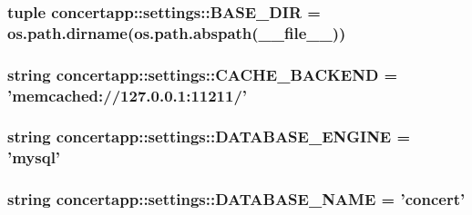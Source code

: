 \label{namespaceconcertapp_1_1settings_a8c1ac824cf01b178c085f46a12a0b747}
\hypertarget{namespaceconcertapp_1_1settings_a885ea24527143834f9d5b4a14176ffd0}{
\subsubsection[{BASE\_\-DIR}]{\setlength{\rightskip}{0pt plus 5cm}tuple {\bf concertapp::settings::BASE\_\-DIR} = os.path.dirname(os.path.abspath(\_\-\_\-file\_\-\_\-))}}
\label{namespaceconcertapp_1_1settings_a885ea24527143834f9d5b4a14176ffd0}
\hypertarget{namespaceconcertapp_1_1settings_aca003552cce2e329b71193ab95f9d02d}{
\subsubsection[{CACHE\_\-BACKEND}]{\setlength{\rightskip}{0pt plus 5cm}string {\bf concertapp::settings::CACHE\_\-BACKEND} = 'memcached://127.0.0.1:11211/'}}
\label{namespaceconcertapp_1_1settings_aca003552cce2e329b71193ab95f9d02d}
\hypertarget{namespaceconcertapp_1_1settings_af522d15c4d99b4a69ffa7c67722902e1}{
\subsubsection[{DATABASE\_\-ENGINE}]{\setlength{\rightskip}{0pt plus 5cm}string {\bf concertapp::settings::DATABASE\_\-ENGINE} = 'mysql'}}
\label{namespaceconcertapp_1_1settings_af522d15c4d99b4a69ffa7c67722902e1}
\hypertarget{namespaceconcertapp_1_1settings_a4d86bb87bfe8f05c81b33104e66b797a}{
\subsubsection[{DATABASE\_\-NAME}]{\setlength{\rightskip}{0pt plus 5cm}string {\bf concertapp::settings::DATABASE\_\-NAME} = 'concert'}}
\label{namespaceconcertapp_1_1settings_a4d86bb87bfe8f05c81b33104e66b797a}
